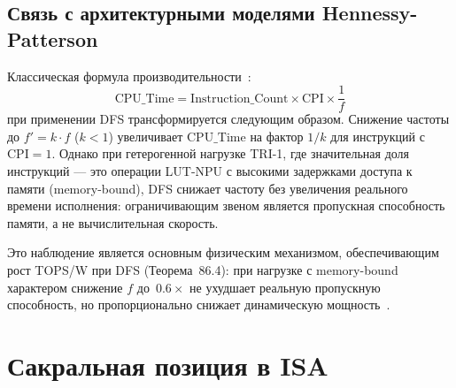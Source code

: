 \subsection{Связь с архитектурными моделями Hennessy-Patterson}
\label{subsec:hp-perf-model}

Классическая формула производительности~\cite{Hennessy-Patterson-CA6}:
\[
  \mathrm{CPU\_Time} = \mathrm{Instruction\_Count} \times \mathrm{CPI} \times \frac{1}{f}
\]
при применении DFS трансформируется следующим образом.  Снижение частоты
до $f' = k \cdot f$ ($k < 1$) увеличивает $\mathrm{CPU\_Time}$ на фактор
$1/k$ для инструкций с $\mathrm{CPI} = 1$.  Однако при гетерогенной нагрузке
TRI-1, где значительная доля инструкций — это операции LUT-NPU с высокими
задержками доступа к памяти (memory-bound), DFS снижает частоту без
увеличения реального времени исполнения: ограничивающим звеном является
пропускная способность памяти, а не вычислительная скорость.

Это наблюдение является основным физическим механизмом, обеспечивающим
рост TOPS/W при DFS (Теорема~86.4): при нагрузке с memory-bound характером
снижение $f$ до~$0{.}6\times$ не ухудшает реальную пропускную способность,
но пропорционально снижает динамическую мощность~\cite{Hennessy-Patterson-CA6}.

\section{Сакральная позиция в ISA}
\label{sec:glava86-sacred}


